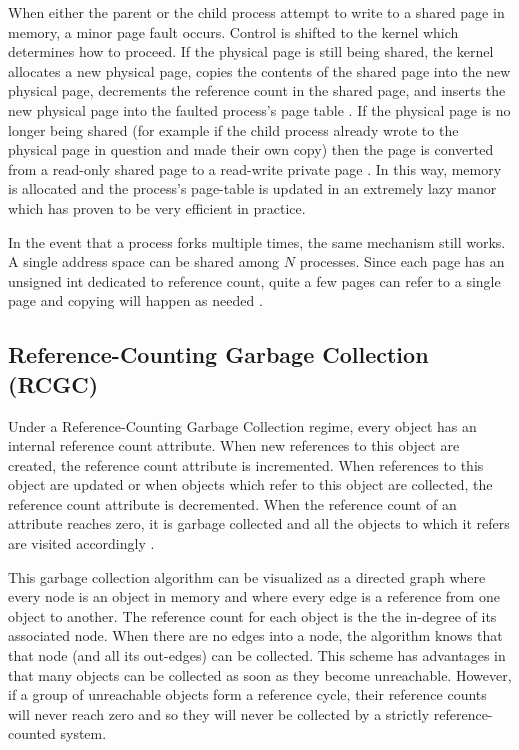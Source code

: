 \documentclass{article}
\begin{document}
  When either the parent or the child process attempt to write to a shared page in memory, a minor page fault occurs.  Control is shifted to the kernel which determines how to proceed.  If the physical page is still being shared, the kernel allocates a new physical page, copies the contents of the shared page into the new physical page, decrements the reference count in the shared page, and inserts the new physical page into the faulted process's page table \cite{VMM}.  If the physical page is no longer being shared (for example if the child process already wrote to the physical page in question and made their own copy) then the page is converted from a read-only shared page to a read-write private page \cite{VMM}.  In this way, memory is allocated and the process's page-table is updated in an extremely lazy manor which has proven to be very efficient in practice.  

  In the event that a process forks multiple times, the same mechanism still works.  A single address space can be shared among $N$ processes.  Since each page has an unsigned int dedicated to reference count, quite a few pages can refer to a single page and copying will happen as needed \cite{kernelsource,VMM}.  

  \subsection{Reference-Counting Garbage Collection (RCGC)}\label{sec:RCGC}

  Under a Reference-Counting Garbage Collection regime, every object has an internal reference count attribute.  When new references to this object are created, the reference count attribute is incremented.  When references to this object are updated or when objects which refer to this object are collected, the reference count attribute is decremented.  When the reference count of an attribute reaches zero, it is garbage collected and all the objects to which it refers are visited accordingly \cite{GC-continuum}.  

  This garbage collection algorithm can be visualized as a directed graph where every node is an object in memory and where every edge is a reference from one object to another.  The reference count for each object is the the in-degree of its associated node.  When there are no edges into a node, the algorithm knows that that node (and all its out-edges) can be collected.  This scheme has advantages in that many objects can be collected as soon as they become unreachable.  However, if a group of unreachable objects form a reference cycle, their reference counts will never reach zero and so they will never be collected by a strictly reference-counted system.  
\end{document}
